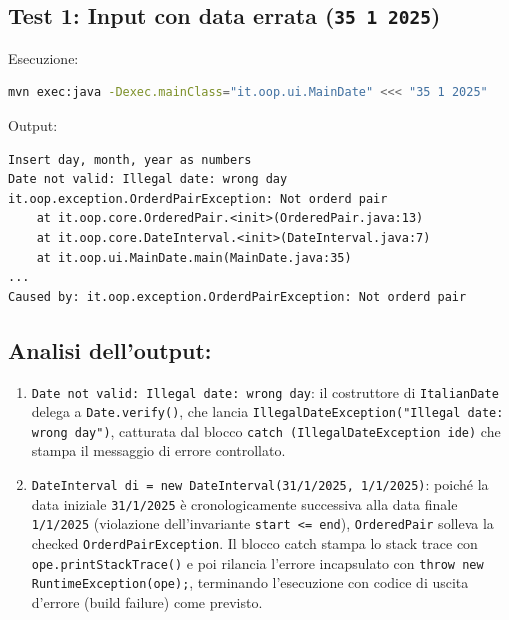 \documentclass[11pt,a4paper,oneside]{report}
\newcommand{\passthrough}[1]{#1}
\providecommand{\tightlist}{\setlength{\itemsep}{0pt}\setlength{\parskip}{0pt}}
\begin{document}
\subsection{\texorpdfstring{Test 1: Input con data errata
(\texttt{35\ 1\ 2025})}{Test 1: Input con data errata (35 1 2025)}}\label{chap16_test-1-input-con-data-errata-35-1-2025}

Esecuzione:

\begin{lstlisting}[language=bash]
mvn exec:java -Dexec.mainClass="it.oop.ui.MainDate" <<< "35 1 2025"
\end{lstlisting}

Output:

\begin{lstlisting}
Insert day, month, year as numbers
Date not valid: Illegal date: wrong day
it.oop.exception.OrderdPairException: Not orderd pair
    at it.oop.core.OrderedPair.<init>(OrderedPair.java:13)
    at it.oop.core.DateInterval.<init>(DateInterval.java:7)
    at it.oop.ui.MainDate.main(MainDate.java:35)
...
Caused by: it.oop.exception.OrderdPairException: Not orderd pair
\end{lstlisting}

\subsection{Analisi dell'output:}\label{chap16_analisi-delloutput}

\begin{enumerate}
\def\labelenumi{\arabic{enumi}.}
\tightlist
\item
  \passthrough{\lstinline!Date not valid: Illegal date: wrong day!}: il
  costruttore di \passthrough{\lstinline!ItalianDate!} delega a
  \passthrough{\lstinline!Date.verify()!}, che lancia
  \passthrough{\lstinline!IllegalDateException("Illegal date: wrong day")!},
  catturata dal blocco
  \passthrough{\lstinline!catch (IllegalDateException ide)!} che stampa
  il messaggio di errore controllato.
\item
  \passthrough{\lstinline!DateInterval di = new DateInterval(31/1/2025, 1/1/2025)!}:
  poiché la data iniziale \passthrough{\lstinline!31/1/2025!} è
  cronologicamente successiva alla data finale
  \passthrough{\lstinline!1/1/2025!} (violazione dell'invariante
  \passthrough{\lstinline!start <= end!}),
  \passthrough{\lstinline!OrderedPair!} solleva la checked
  \passthrough{\lstinline!OrderdPairException!}. Il blocco catch stampa
  lo stack trace con \passthrough{\lstinline!ope.printStackTrace()!} e
  poi rilancia l'errore incapsulato con
  \passthrough{\lstinline!throw new RuntimeException(ope);!}, terminando
  l'esecuzione con codice di uscita d'errore (build failure) come
  previsto.
\end{enumerate}
\end{document}
